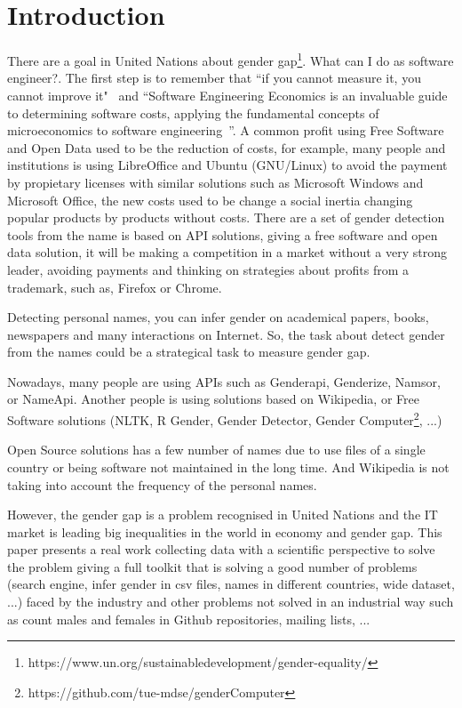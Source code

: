 \documentclass[a4paper]{article}
\begin{document}
\section{Introduction}
There are a goal in United Nations about gender
gap\footnote{https://www.un.org/sustainabledevelopment/gender-equality/}. What
can I do as software engineer?. The first step is to remember that
``if you cannot measure it, you cannot improve
it"~\cite{thompson1833electrical} and ``Software Engineering Economics
is an invaluable guide to determining software costs, applying the
fundamental concepts of microeconomics to software
engineering~\cite{barry1981software}''. A common profit using Free
Software and Open Data used to be the reduction of costs, for example,
many people and institutions is using LibreOffice and Ubuntu
(GNU/Linux) to avoid the payment by propietary licenses with similar
solutions such as Microsoft Windows and Microsoft Office, the new
costs used to be change a social inertia changing popular products by
products without costs. There are a set of gender detection tools from
the name is based on API solutions, giving a free software and open
data solution, it will be making a competition in a market without a
very strong leader, avoiding payments and thinking on strategies about
profits from a trademark, such as, Firefox or Chrome.

Detecting personal names, you can infer gender on academical papers,
books, newspapers and many interactions on Internet. So, the task
about detect gender from the names could be a strategical task to
measure gender gap.

Nowadays, many people are using APIs such as Genderapi, Genderize,
Namsor, or NameApi. Another people is using solutions based on
Wikipedia, or Free Software solutions (NLTK\cite{loper2002nltk}, R
Gender, Gender Detector, Gender
Computer\footnote{https://github.com/tue-mdse/genderComputer}, ...)

Open Source solutions has a few number of names due to use files of a
single country or being software not maintained in the long time. And
Wikipedia is not taking into account the frequency of the personal
names.

However, the gender gap is a problem recognised in United Nations and
the IT market is leading big inequalities in the world in economy and
gender gap. This paper presents a real work collecting data with a
scientific perspective to solve the problem giving a full toolkit that
is solving a good number of problems (search engine, infer gender in
csv files, names in different countries, wide dataset, ...) faced by
the industry and other problems not solved in an industrial way such
as count males and females in Github repositories, mailing lists, ...
\end{document}
